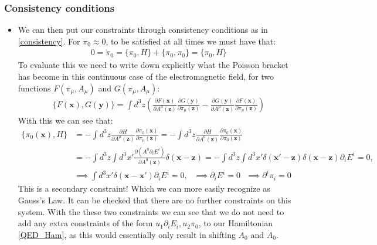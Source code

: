 \documentclass[11pt]{article}
\numberwithin{equation}{section}
\begin{document}
\subsubsection{Consistency conditions} %
\label{ssub:consistency_conditions}
\begin{itemize}
\item We can then put our constraints through consistency conditions as in \ref{consistency}. For $\pi_0 \approx 0$, to be satisfied at all times we must have that:
\begin{align*}
      0  = \dot{\pi}_0 = \{\pi_0,H\} +\{\pi_0,\pi_0\}  = \{\pi_0,H\}
\end{align*}
To evaluate this we need to write down explicitly what the Poisson bracket has become in this continuous case of the electromagnetic field, for two functions $F(\pi_{\mu},A_\mu)$ and $G(\pi_{\mu},A_\mu)$:
\begin{align}
           \label{Poisson_cont}
           \{F(\textbf{x}),G(\textbf{y})\} =  \int d^3z \left(\frac{\partial F(\textbf{x})}{\partial A^\mu(\textbf{z})}\frac{\partial G(\textbf{y})}{\partial \pi_\mu(\textbf{z})}-\frac{\partial G(\textbf{y})}{\partial A^\mu(\textbf{z})}\frac{\partial F(\textbf{x})}{\partial \pi_\mu(\textbf{z})}\right)
\end{align}
With this we can see that:
\begin{align*}
  \{\pi_0(\textbf{x}),H\} & = - \int d^3z\frac{\partial H}{\partial A^\mu(\textbf{z})}\frac{\partial \pi_0(\textbf{x})}{\partial \pi_\mu(\textbf{z})} = - \int d^3z\frac{\partial H}{\partial A^0(\textbf{z})}\frac{\partial \pi_0(\textbf{x})}{\partial \pi_0(\textbf{z})}   \\
  & =- \int d^3z\int d^3x'\frac{\partial (A^0\partial_iE^i)}{\partial A^0(\textbf{z})}\delta(\textbf{x}-\textbf{z})= - \int d^3z\int d^3x'\delta(\textbf{x}'-\textbf{z})\delta(\textbf{x}-\textbf{z})\partial_iE^i = 0 ,  \\ 
  & \implies \int d^3x'\delta(\textbf{x}-\textbf{x}')\partial_iE^i = 0, ~~~\implies \partial_iE^i = 0~~~\implies \partial^i\pi_i = 0
\end{align*}
This is a secondary constraint! Which we can more easily recognize as Gauss's Law. It can be checked that there are no further constraints on this system. With the these two constraints we can see that we do not need to add any extra constraints of the form $u_1\partial_iE_i,u_2\pi_0$, to our Hamiltonian \ref{QED_Ham}, as this would essentially only result in shifting $A_0$ and $\dot{A}_0$.  
\end{itemize}
\end{document}
